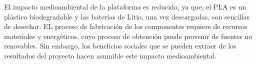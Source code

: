 El impacto medioambiental de la plataforma es reducido, ya que, el PLA es un plástico biodegradable y las baterías de Litio, una vez descargadas, son sencillas de desechar. EL proceso de fabricación de los componentes requiere de recursos materiales y energéticos, cuyo proceso de obtención  puede provenir de fuentes no renovables. Sin embargo, los beneficios sociales que se pueden extraer de los resultados del proyecto hacen asumible este impacto medioambiental.


